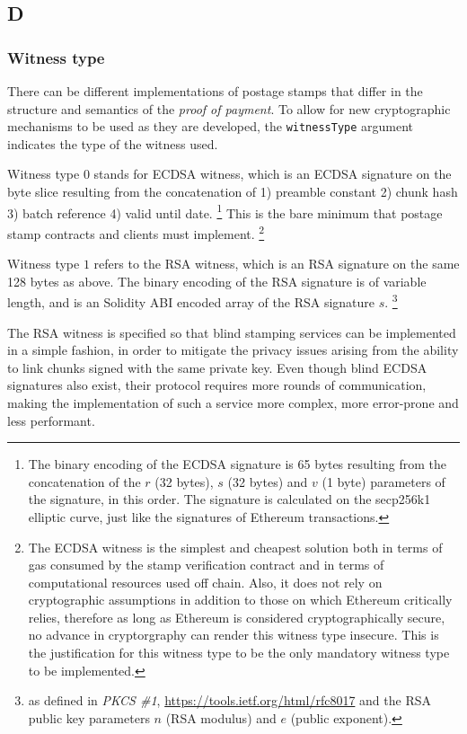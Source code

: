 
\subsection{D}
\subsubsection{Witness type}

There can be different implementations of postage stamps that differ in the structure and semantics of the \emph{proof of payment}. To allow for new cryptographic mechanisms to be used as they are developed, the \lstinline{witnessType} argument indicates the type of the witness used. 

Witness type $0$ stands for ECDSA witness, which is an ECDSA signature on the byte slice resulting from the concatenation of   1) preamble constant 2) chunk hash 3) batch reference 4) valid until date.%
%
\footnote{The binary encoding of the ECDSA signature is 65 bytes resulting from the concatenation of the $r$ (32 bytes), $s$ (32 bytes) and $v$ (1 byte) parameters of the signature, in this order. The signature is calculated on the secp256k1 elliptic curve, just like the signatures of Ethereum transactions.}
%
This is the bare minimum that postage stamp contracts and clients must implement.%
%
\footnote{The ECDSA witness is the simplest and cheapest solution both in terms of gas consumed by the stamp verification contract and in terms of computational resources used off chain. Also, it does not rely on cryptographic assumptions in addition to those on which Ethereum critically relies, therefore as long as Ethereum is considered cryptographically secure, no advance in cryptorgraphy can render this witness type insecure. This is the justification for this witness type to be the only mandatory witness type to be implemented.}

Witness type $1$ refers to the RSA witness, which is an RSA signature on the same 128 bytes as above. The binary encoding of the RSA signature is of variable length, and is an Solidity ABI encoded array of the RSA signature $s$.%
%
\footnote{as defined in \emph{PKCS \#1}, \url{https://tools.ietf.org/html/rfc8017} and the RSA public key parameters $n$ (RSA modulus) and $e$ (public exponent).}

The RSA witness is specified so that blind stamping services can be implemented in a simple fashion, in order to mitigate the privacy issues arising from the ability to link chunks signed with the same private key. Even though blind ECDSA signatures also exist, their protocol requires more rounds of communication, making the implementation of such a service more complex, more error-prone and less performant. 

